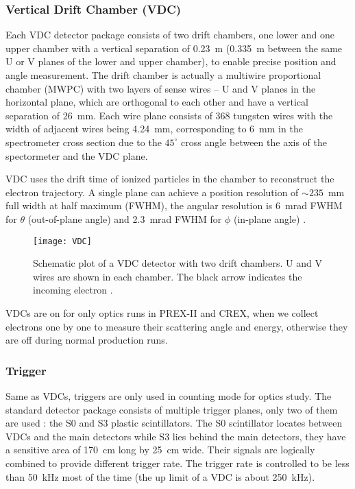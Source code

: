 \subsubsection{Vertical Drift Chamber (VDC)}
Each VDC detector package consists of two drift chambers, one lower and one upper
chamber with a vertical separation of 0.23~m (0.335~m between the same
U or V planes of the lower and upper chamber), to enable precise position and angle measurement. 
The drift chamber is actually a multiwire proportional chamber (MWPC) with two 
layers of sense wires -- U and V planes in the horizontal plane, which are 
orthogonal to each other and have a vertical separation of 26~mm. 
Each wire plane consists of 368 tungsten wires with the width of adjacent wires 
being 4.24~mm, corresponding to 6~mm in the spectrometer cross section due to the $45^\circ$
cross angle between the axis of the spectormeter and the VDC plane. 

VDC uses the drift time of ionized particles in the chamber to reconstruct 
the electron trajectory. A single plane can achieve a position resolution 
of $\sim 235$~mm full width at half maximum (FWHM), 
the angular resolution is 6~mrad FWHM for $\theta$ (out-of-plane angle) 
and 2.3~mrad FWHM for $\phi$ (in-plane angle) \cite{FISSUM2001108}.
\begin{figure}[!h]
    \centering
    \texttt{[image: VDC]}
    \caption{Schematic plot of a VDC detector with two drift chambers.
    U and V wires are shown in each chamber. The black arrow indicates the 
    incoming electron \cite{FISSUM2001108}.
    }
\end{figure}

VDCs are on for only optics runs in PREX-II and CREX, when we collect electrons
one by one to measure their scattering angle and energy, otherwise they are
off during normal production runs.


\subsubsection{Trigger}
Same as VDCs, triggers are only used in counting mode for optics study. The standard
detector package consists of multiple trigger planes, only two of them are used :
the S0 and S3 plastic scintillators. The S0 scintillator locates between VDCs and the main
detectors while S3 lies behind the main detectors, they have a sensitive area
of 170~cm long by 25~cm wide. Their signals are logically combined to 
provide different trigger rate. The trigger rate is controlled to be less
than 50~kHz most of the time (the up limit of a VDC is about 250~kHz).


